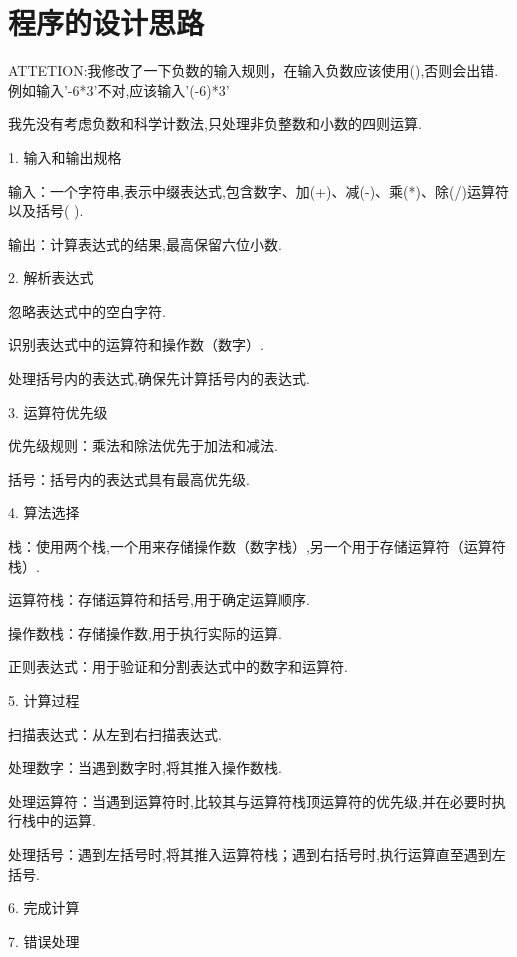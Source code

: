 \documentclass[UTF8]{ctexart}
\begin{document}
\pagestyle{fancy}
\fancyhead{}

\section{程序的设计思路}

ATTETION:我修改了一下负数的输入规则，在输入负数应该使用(),否则会出错.例如输入'-6*3'不对,应该输入'(-6)*3'

我先没有考虑负数和科学计数法,只处理非负整数和小数的四则运算.

1. 输入和输出规格

输入：一个字符串,表示中缀表达式,包含数字、加(+)、减(-)、乘(*)、除(/)运算符以及括号( ).

输出：计算表达式的结果,最高保留六位小数.



2. 解析表达式

忽略表达式中的空白字符.

识别表达式中的运算符和操作数（数字）.

处理括号内的表达式,确保先计算括号内的表达式.



3. 运算符优先级

优先级规则：乘法和除法优先于加法和减法.

括号：括号内的表达式具有最高优先级.



4. 算法选择

栈：使用两个栈,一个用来存储操作数（数字栈）,另一个用于存储运算符（运算符栈）.

运算符栈：存储运算符和括号,用于确定运算顺序.

操作数栈：存储操作数,用于执行实际的运算.

正则表达式：用于验证和分割表达式中的数字和运算符.



5. 计算过程

扫描表达式：从左到右扫描表达式.

处理数字：当遇到数字时,将其推入操作数栈.

处理运算符：当遇到运算符时,比较其与运算符栈顶运算符的优先级,并在必要时执行栈中的运算.

处理括号：遇到左括号时,将其推入运算符栈；遇到右括号时,执行运算直至遇到左括号.



6. 完成计算



7. 错误处理
\end{document}
